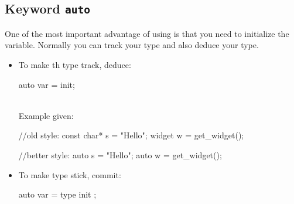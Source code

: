 \subsection{Keyword \texttt{auto}}
\label{subsec:Keyword auto}
One of the most important advantage of using  is that you need to initialize the variable. Normally you can track your type and also deduce your type. 
\begin{itemize}
    \item To make th type track, deduce:\\
    \begin{minipage}{\MPWxXXSxLISTING\textwidth} %
        \begin{CPPCode}
auto var = init;
        \end{CPPCode}
    \end{minipage}\\ 
    Example given:\\
\begin{minipage}{\MPWxXXSxLISTING\textwidth} %
{} %
        \begin{CPPCode}
//old style:
const char* s = "Hello";
widget w = get_widget();
        \end{CPPCode}
    \end{minipage}
    \begin{minipage}{\MPWxXXSxLISTING\textwidth} %
        \begin{CPPCode}
//better style:
auto s = "Hello";
auto w = get_widget();
        \end{CPPCode}
    \end{minipage}
    \item To make type stick, commit:\\
    \begin{minipage}{\MPWxXXSxLISTING\textwidth} %
{} %
        \begin{CPPCode}
        auto var = type{ init };
\end{CPPCode}
\end{minipage}\\

\end{itemize}
